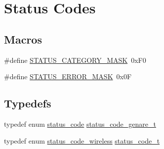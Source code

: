 \hypertarget{group__group__sam0__utils__status__codes}{}\section{Status Codes}
\label{group__group__sam0__utils__status__codes}
\subsection*{Macros}
\begin{DoxyCompactItemize}
\item 
\#define \mbox{\hyperlink{group__group__sam0__utils__status__codes_ga5bf938a904077896054cd093bf7d8fa8}{S\+T\+A\+T\+U\+S\+\_\+\+C\+A\+T\+E\+G\+O\+R\+Y\+\_\+\+M\+A\+SK}}~0x\+F0
\item 
\#define \mbox{\hyperlink{group__group__sam0__utils__status__codes_ga4c46d8f176ca46ab775db0fe270d2f98}{S\+T\+A\+T\+U\+S\+\_\+\+E\+R\+R\+O\+R\+\_\+\+M\+A\+SK}}~0x0F
\end{DoxyCompactItemize}
\subsection*{Typedefs}
\begin{DoxyCompactItemize}
\item 
typedef enum \mbox{\hyperlink{group__group__sam0__utils__status__codes_ga751c892e5a46b8e7d282085a5a5bf151}{status\+\_\+code}} \mbox{\hyperlink{group__group__sam0__utils__status__codes_gac00c8566f7cf35542ab21a113933f485}{status\+\_\+code\+\_\+genare\+\_\+t}}
\item 
typedef enum \mbox{\hyperlink{group__group__sam0__utils__status__codes_ga29235ed38b6f02861f29daae665ac3a2}{status\+\_\+code\+\_\+wireless}} \mbox{\hyperlink{group__group__sam0__utils__status__codes_ga68396b4d6dda8fc779819385588e4853}{status\+\_\+code\+\_\+t}}
\end{DoxyCompactItemize}
